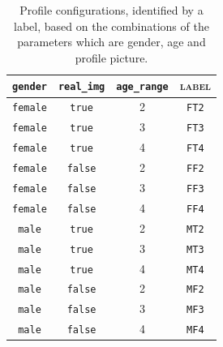 \begin{table}[h!]
\begin{center}
	\begin{tabular}{ |c|c|c|c| } 
		\hline 
		\cellcolor[HTML]{b0d7ff} \texttt{gender} & 
		\cellcolor[HTML]{b0d7ff} \texttt{real\_img} & 
		\cellcolor[HTML]{b0d7ff} \texttt{age\_range} &
		\cellcolor[HTML]{b0d7ff} \textsc{label}	\\
		\hline 
		\texttt{female}	&	\texttt{true}	&	\textsc{2}	
		&	\cellcolor[HTML]{e6f2ff} \texttt{FT2}\\	 
		\hline
		\texttt{female}	&	\texttt{true}	&	\textsc{3}	
		&\cellcolor[HTML]{e6f2ff} \texttt{FT3}\\	 
		\hline
		\texttt{female}	&	\texttt{true}	&	\textsc{4}	
		& \cellcolor[HTML]{e6f2ff} \texttt{FT4}\\	 
		\hline
		\texttt{female}	&	\texttt{false}	&	\textsc{2}	
		& \cellcolor[HTML]{e6f2ff} \texttt{FF2}\\	 
		\hline
		\texttt{female}	&	\texttt{false}	&	\textsc{3}	
		& \cellcolor[HTML]{e6f2ff} \texttt{FF3}\\
		\hline
		\texttt{female}	&	\texttt{false}	&	\textsc{4}	
		& \cellcolor[HTML]{e6f2ff} \texttt{FF4}\\
		\hline 	
		\texttt{male}	&	\texttt{true}	&	\textsc{2}	
		& \cellcolor[HTML]{e6f2ff} \texttt{MT2}\\
		\hline
		\texttt{male}	&	\texttt{true}	&	\textsc{3}	
		& \cellcolor[HTML]{e6f2ff} \texttt{MT3}\\	 
		\hline
		\texttt{male}	&	\texttt{true}	&	\textsc{4}	
		& \cellcolor[HTML]{e6f2ff} \texttt{MT4}\\
		\hline
		\texttt{male}	&	\texttt{false}	&	\textsc{2}	
		& \cellcolor[HTML]{e6f2ff} \texttt{MF2}\\
		\hline
		\texttt{male}	&	\texttt{false}	&	\textsc{3}	
		& \cellcolor[HTML]{e6f2ff} \texttt{MF3}\\
		\hline
		\texttt{male}	&	\texttt{false}	&	\textsc{4}	
		& \cellcolor[HTML]{e6f2ff} \texttt{MF4}\\
		\hline 	 	 	 	 	
	\end{tabular}
	\caption{Profile configurations, identified by a label, based on the combinations of the parameters which are gender, age and profile picture.}
	\label{table:configuration}
\end{center}
\end{table}

